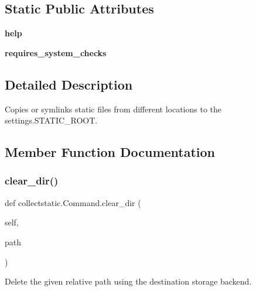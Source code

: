 \subsection*{Static Public Attributes}
\begin{DoxyCompactItemize}
\item 
\mbox{\label{classcollectstatic_1_1_command_aca9f02341c1e00064d002f173c5e9cd4}} 
{\bfseries help}
\item 
\mbox{\label{classcollectstatic_1_1_command_a1fdeecbca2bfe0726609fcc95d7db097}} 
{\bfseries requires\+\_\+system\+\_\+checks}
\end{DoxyCompactItemize}


\subsection{Detailed Description}
\begin{DoxyVerb}Copies or symlinks static files from different locations to the
settings.STATIC_ROOT.
\end{DoxyVerb}
 

\subsection{Member Function Documentation}
\mbox{\label{classcollectstatic_1_1_command_a7b3b8efdcb0e85c8e34e60ca3a8edb9f}} 
\subsubsection{\texorpdfstring{clear\+\_\+dir()}{clear\_dir()}}
{\footnotesize\ttfamily def collectstatic.\+Command.\+clear\+\_\+dir (\begin{DoxyParamCaption}\item[{}]{self,  }\item[{}]{path }\end{DoxyParamCaption})}

\begin{DoxyVerb}Delete the given relative path using the destination storage backend.
\end{DoxyVerb}
 \mbox{\label{classcollectstatic_1_1_command_a87b98c34cdd7ca085989391a651001ea}} 
